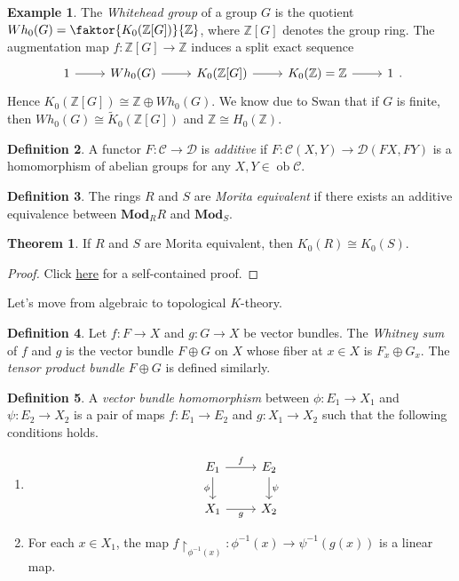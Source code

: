 \documentclass[10pt,letterpaper,cm]{nupset}
\theoremstyle{definition}
\newtheorem{definition}{Definition}
\newtheorem{exmp}[definition]{Example}
\theoremstyle{theorem}
\newtheorem{theorem}{Theorem}
\theoremstyle{remark}
\newcommand{\Z}{\mathbb Z}
\newcommand{\1}{\mathbf{1}}
\renewcommand{\c}{\mathscr{C}}
\renewcommand{\d}{\mathscr{D}}
\newcommand{\0}{\vec 0}
\DeclareMathOperator{\ob}{ob}
\begin{document}
\begin{exmp}
The \textit{Whitehead group} of a group $G$ is the quotient $Wh_0(G) =\faktor{K_0(\Z[G])}{\Z}$, where $\Z[G]$ denotes the group ring. The augmentation map $f: \Z[G] \to \Z$ induces a split exact sequence 
\[
\begin{tikzcd}
1 \arrow[r] & Wh_0(G) \arrow[r] & K_0(\Z[G]) \arrow[r] & K_0(\Z) =\mathbb Z \arrow[r] & 1
\end{tikzcd}.
\]
 Hence $K_0(\Z[G]) \cong \Z \oplus Wh_0(G)$. We know due to Swan that if $G$ is finite, then $Wh_0(G) \cong \widetilde{K}_0(\Z[G])$  and $\Z \cong H_0(\Z)$. 
\end{exmp}

\begin{definition}
A functor $F: \c \to \d$ is \textit{additive} if $F: \c(X, Y) \to \d(FX, FY)$ is a homomorphism of abelian groups for any $X, Y \in \ob \c$.
\end{definition}

\begin{definition}
The rings $R$ and $S$ are \textit{Morita equivalent} if there exists an additive equivalence between $\mathbf{Mod}_R$$R$ and $\mathbf{Mod}_S$. 
\end{definition}

\begin{theorem}
If $R$ and $S$ are Morita equivalent, then $K_0(R) \cong K_0(S)$.
\end{theorem}
\begin{proof}
Click \href{http://www.staff.science.uu.nl/~henri105/Seminars/AlgKthy2011Talk3.pdf}{here} for a self-contained proof.
\end{proof}

Let's move from algebraic to topological $K$-theory.

\begin{definition}
Let $f: F \to X$ and $g: G \to X$ be vector bundles. The \textit{Whitney sum} of $f$ and $g$ is the vector bundle $F \oplus G$ on $X$ whose fiber at $x \in X$ is $F_x \oplus G_x$.  The \textit{tensor product bundle} $F \oplus G$ is defined similarly.
\end{definition}

\begin{definition}
A \textit{vector bundle homomorphism} between $\phi : E_1 \to X_1$ and $\psi : E_2 \to X_2$ is a pair of maps $f: E_1 \to E_2$ and $g: X_1 \to X_2$ such that the following conditions holds.
\begin{enumerate}
\item 
\[
\begin{tikzcd}
E_1 \arrow[r, "f"] \arrow[d, "\phi"'] & E_2 \arrow[d, "\psi"] \\
X_1 \arrow[r, "g"'] & X_2
\end{tikzcd}
\]
\item For each $x \in X_1$, the map $f \restriction_{\phi^{{-}1}(x)} : \phi^{{-}1}(x) \to \psi^{{-}1}(g(x))$ is a linear map.
\end{enumerate}
\end{definition}
\end{document}
